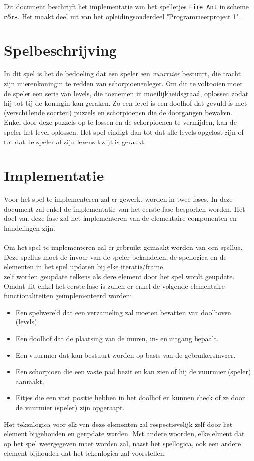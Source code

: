 Dit document beschrijft het implementatie van het spelletjes \texttt{Fire Ant} in scheme \textbf{r5rs}.
Het maakt deel uit van het opleidingsonderdeel "Programmeerproject 1".

\section{Spelbeschrijving}

In dit spel is het de bedoeling dat een speler een \textit{vuurmier} bestuurt, die tracht zijn mierenkoningin te redden van schorpioenenleger.
Om dit te voltooien moet de speler een serie van levels, die toenemen in moeilijkheidsgraad, oplossen zodat hij tot bij de koningin kan geraken.
Zo een level is een doolhof dat gevuld is met (verschillende soorten) puzzels en schorpioenen die de doorgangen bewaken.
Enkel door deze puzzels op te lossen en de schorpioenen te vermijden, kan de speler het level oplossen.
Het spel eindigt dan tot dat alle levels opgelost zijn of tot dat de speler al zijn levens kwijt is geraakt.

\section{Implementatie}

Voor het spel te implementeren zal er gewerkt worden in twee fases.
In deze document zal enkel de implementatie van het eerste fase besporken worden.
Het doel van deze fase zal het implementeren van de elementaire componenten en handelingen zijn.\\
\\
Om het spel te implementeren zal er gebruikt gemaakt worden van een spellus.
Deze spellus moet de invoer van de speler behandelen, de spellogica en de elementen in het spel updaten bij elke iteratie/frame.\\
zelf worden geupdate telkens als deze element door het spel wordt geupdate.
Omdat dit enkel het eerste fase is zullen er enkel de volgende elementaire functionaliteiten ge\"implementeerd worden:

\begin{itemize}
	\item Een spelwereld dat een verzameling zal moeten bevatten van doolhoven (levels).
	\item Een doolhof dat de plaatsing van de muren, in- en uitgang bepaalt.
	\item Een vuurmier dat kan bestuurt worden op basis van de gebruikersinvoer.
	\item Een schorpioen die een vaste pad bezit en kan zien of hij de vuurmier (speler) aanraakt.
	\item Eitjes die een vast positie hebben in het doolhof en kunnen check of ze door de vuurmier (speler) zijn opgeraapt.
\end{itemize}

Het tekenlogica voor elk van deze elementen zal respectievelijk zelf door het element bijgehouden en geupdate worden.
Met andere woorden, elke elment dat op het spel weergegeven moet worden zal, naast het spellogica, ook een andere element bijhouden dat het tekenlogica zal voorstellen.

